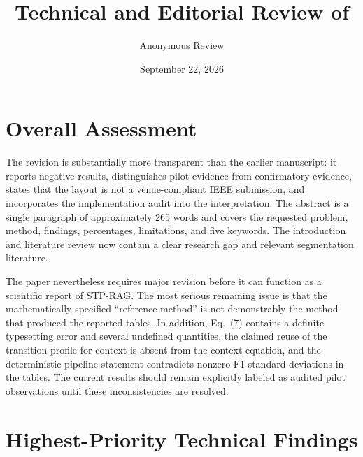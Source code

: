 \documentclass[11pt]{article}
\title{Technical and Editorial Review of \paper}
\author{Anonymous Review}
\date{September 22, 2026}
\begin{document}
\maketitle

\section*{Overall Assessment}

The revision is substantially more transparent than the earlier manuscript: it reports negative results, distinguishes pilot evidence from confirmatory evidence, states that the layout is not a venue-compliant IEEE submission, and incorporates the implementation audit into the interpretation. The abstract is a single paragraph of approximately 265 words and covers the requested problem, method, findings, percentages, limitations, and five keywords. The introduction and literature review now contain a clear research gap and relevant segmentation literature.

The paper nevertheless requires major revision before it can function as a scientific report of STP-RAG. The most serious remaining issue is that the mathematically specified ``reference method'' is not demonstrably the method that produced the reported tables. In addition, Eq.~(7) contains a definite typesetting error and several undefined quantities, the claimed reuse of the transition profile for context is absent from the context equation, and the deterministic-pipeline statement contradicts nonzero F1 standard deviations in the tables. The current results should remain explicitly labeled as audited pilot observations until these inconsistencies are resolved.

\section*{Highest-Priority Technical Findings}
\end{document}
